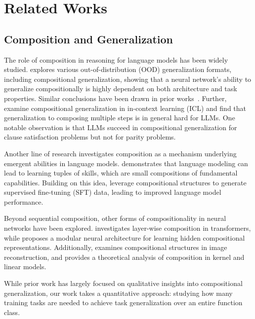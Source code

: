 \section{Related Works}



\subsection{Composition and Generalization}

The role of composition in reasoning for language models has been widely studied.  
\cite{saparov2023testing} explores various out-of-distribution (OOD) generalization formats, including compositional generalization, showing that a neural network’s ability to generalize compositionally is highly dependent on both architecture and task properties. Similar conclusions have been drawn in prior works~\citep{lake2018generalization, keysers2019measuring}. Further, \citep{bhattamishra2024understanding, dziri2023faith, an2023context, xu2024do} examine compositional generalization in in-context learning (ICL) and find that generalization to composing multiple steps is in general hard for LLMs. One notable observation is that LLMs succeed in compositional generalization for clause satisfaction problems but not for parity problems. 

Another line of research investigates composition as a mechanism underlying emergent abilities in language models. \cite{arora2023theory} demonstrates that language modeling can lead to learning tuples of skills, which are small compositions of fundamental capabilities. Building on this idea, \citep{kaur2024instruct, zhao2024can} leverage compositional structures to generate supervised fine-tuning (SFT) data, leading to improved language model performance.  

Beyond sequential composition, other forms of compositionality in neural networks have been explored. \cite{song2024out} investigates layer-wise composition in transformers, while \cite{schug2023discovering} proposes a modular neural architecture for learning hidden compositional representations. Additionally, \cite{wiedemer2024compositional} examines compositional structures in image reconstruction, and \cite{lippl2024does} provides a theoretical analysis of composition in kernel and linear models.  

While prior work has largely focused on qualitative insights into compositional generalization, our work takes a quantitative approach: studying how many training tasks are needed to achieve task generalization over an entire function class.







